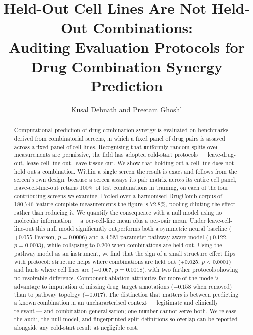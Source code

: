 \documentclass{ws-procs11x85}
\begin{document}
\title{Held-Out Cell Lines Are Not Held-Out Combinations:\\
Auditing Evaluation Protocols for Drug Combination Synergy Prediction}

\author{Kusal Debnath and Preetam Ghosh$^\dag$}

\address{Department of Computer Science, Virginia Commonwealth University,\\
Richmond, Virginia 23284, USA\\
$^\dag$E-mail: pghosh@vcu.edu}

\begin{abstract}
Computational prediction of drug-combination synergy is evaluated on benchmarks
derived from combinatorial screens, in which a fixed panel of drug pairs is
assayed across a fixed panel of cell lines. Recognising that uniformly random
splits over measurements are permissive, the field has adopted cold-start
protocols --- leave-drug-out, leave-cell-line-out, leave-tissue-out. We show that
holding out a cell line does not hold out a combination. Within a single screen
the result is exact and follows from the screen's own design: because a screen
assays its pair matrix across its entire cell panel, leave-cell-line-out retains
100\% of test combinations in training, on each of the four contributing screens
we examine. Pooled over a harmonised DrugComb corpus of 180,746 feature-complete
measurements the figure is 72.8\%, pooling diluting the effect rather than
reducing it. We quantify the consequence with a null model using no molecular
information --- a per-cell-line mean plus a per-pair mean. Under
leave-cell-line-out this null model significantly outperforms both a symmetric
neural baseline ($+0.055$ Pearson, $p = 0.0006$) and a 4.5M-parameter
pathway-aware model ($+0.122$, $p = 0.0003$), while collapsing to 0.200 when
combinations are held out. Using the pathway model as an instrument, we find that
the sign of a small structure effect flips with protocol: structure helps where
combinations are held out ($+0.025$, $p < 0.0001$) and hurts where cell lines are
($-0.067$, $p = 0.0018$), with two further protocols showing no resolvable
difference. Component ablation attributes far more of the model's advantage to
imputation of missing drug--target annotations ($-0.158$ when removed) than to
pathway topology ($-0.017$). The distinction that matters is between predicting a
known combination in an uncharacterised context --- legitimate and clinically
relevant --- and combination generalisation; one number cannot serve both. We
release the audit, the null model, and fingerprinted split definitions so overlap
can be reported alongside any cold-start result at negligible cost.
\end{abstract}
\end{document}
